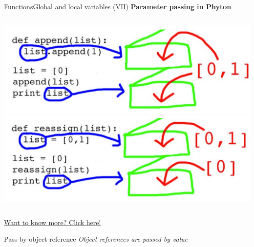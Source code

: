 \documentclass[10pt,compress]{beamer} %
\begin{document}
\begin{frame}{Functions}{Global and local variables (VII)}
\textbf{Parameter passing in Phyton}
\medskip
   \begin{columns}
			\centering \includegraphics[width=\linewidth]{figs/pasoporreferenciaobjeto1.pdf}
		\centering \includegraphics[width=\linewidth]{figs/pasoporreferenciaobjeto2.pdf}
	\end{columns}
	\alert{\href{http://robertheaton.com/2014/02/09/pythons-pass-by-object-reference-as-explained-by-philip-k-dick/}{Want to know more? Click here!}}
\medskip
\begin{block}{Pass-by-object-reference}
\emph{\textit{Object references are passed by value}}
\end{block}
\end{frame}
\end{document}
